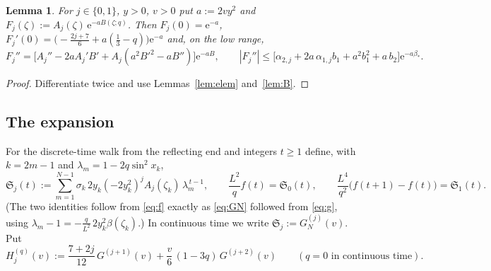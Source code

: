 \documentclass[11pt,a4paper]{article}
\newtheorem{lemma}[theorem]{Lemma}
\theoremstyle{definition}
\theoremstyle{remark}
\newcommand{\ee}{\mathrm{e}}
\begin{document}
\begin{lemma}\label{lem:Fpp}
For $j\in\{0,1\}$, $y>0$, $v>0$ put $a:=2vy^2$ and $F_j(\zeta):=A_j(\zeta)\,\ee^{-aB(\zeta;q)}$. Then
$F_j(0)=\ee^{-a}$, $F_j'(0)=\bigl(-\frac{2j+7}6+a(\frac13-q)\bigr)\ee^{-a}$ and, on the low range,
\[
  F_j''=\bigl[A_j''-2aA_j'B'+A_j(a^2B'^2-aB'')\bigr]\ee^{-aB},\qquad
  |F_j''|\le\bigl[\alpha_{2,j}+2a\,\alpha_{1,j}b_1+a^2b_1^2+a\,b_2\bigr]\ee^{-a\beta_*}.
\]
\end{lemma}
\begin{proof}
Differentiate twice and use Lemmas~\ref{lem:elem} and~\ref{lem:B}.
\end{proof}

\subsection{The expansion}

For the discrete-time walk from the reflecting end and integers $t\ge1$ define, with $k=2m-1$ and
$\lambda_m=1-2q\sin^2x_k$,
\begin{equation}\label{eq:frakS}
  \mathfrak S_j(t):=\sum_{m=1}^{N-1}\sigma_k\,2y_k(-2y_k^2)^jA_j(\zeta_k)\,\lambda_m^{\,t-1},\qquad
  \frac{L^2}{q}f(t)=\mathfrak S_0(t),\qquad \frac{L^4}{q^2}\bigl(f(t+1)-f(t)\bigr)=\mathfrak S_1(t).
\end{equation}
(The two identities follow from \eqref{eq:f} exactly as \eqref{eq:GN} followed from \eqref{eq:g}, using
$\lambda_m-1=-\frac{q}{L^2}\,2y_k^2\beta(\zeta_k)$.) In continuous time we write $\mathfrak S_j:=G_N^{(j)}(v)$. Put
\begin{equation}\label{eq:H}
  H_j^{(q)}(v):=\frac{7+2j}{12}\,G^{(j+1)}(v)+\frac v6\,(1-3q)\,G^{(j+2)}(v)\qquad(q=0\text{ in continuous time}).
\end{equation}
\end{document}
